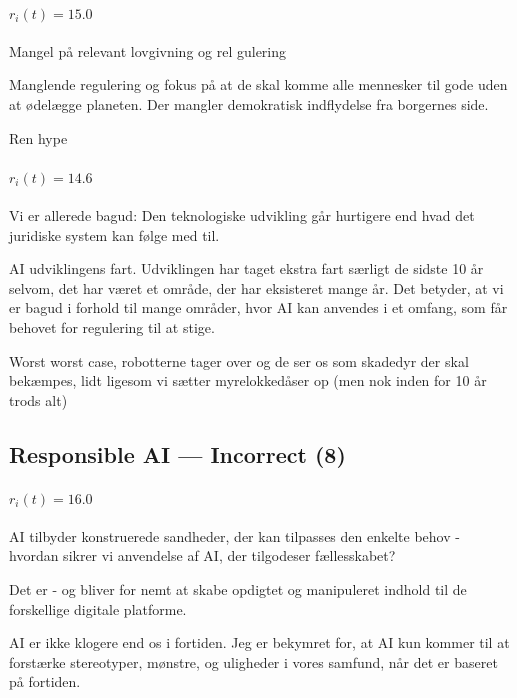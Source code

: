 \paragraph{$r_i(t) = 15.0$}
\begin{description}[style=nextline,leftmargin=1em,font=\normalfont\bfseries]
  \item[Anchor] Mangel på relevant lovgivning og rel  gulering
  \item[Human-judged closer] Manglende regulering og fokus på at de skal komme alle mennesker til gode uden at ødelægge planeten. Der mangler demokratisk indflydelse fra borgernes side.
  \item[Human-judged farther] Ren hype
\end{description}
\paragraph{$r_i(t) = 14.6$}
\begin{description}[style=nextline,leftmargin=1em,font=\normalfont\bfseries]
  \item[Anchor] Vi er allerede bagud:  Den teknologiske udvikling går hurtigere end hvad det juridiske system kan følge med til.
  \item[Human-judged closer] AI udviklingens fart.  Udviklingen har taget ekstra fart særligt de sidste 10 år selvom, det har været et område, der har eksisteret mange år. Det betyder, at vi er bagud i forhold til mange områder, hvor AI kan anvendes i et omfang, som får behovet for regulering til at stige.
  \item[Human-judged farther] Worst worst case, robotterne tager over og de ser os som skadedyr der skal bekæmpes, lidt ligesom vi sætter myrelokkedåser op (men nok inden for 10 år trods alt)
\end{description}

\subsection{Responsible AI --- Incorrect (8)}
\label{app:triplets-rai-incorrect}

\paragraph{$r_i(t) = 16.0$}
\begin{description}[style=nextline,leftmargin=1em,font=\normalfont\bfseries]
  \item[Anchor] AI tilbyder konstruerede sandheder, der kan tilpasses den enkelte behov - hvordan sikrer vi anvendelse af AI, der tilgodeser fællesskabet?
  \item[Human-judged closer] Det er - og bliver for nemt at skabe opdigtet og manipuleret indhold til de forskellige digitale platforme.
  \item[Human-judged farther] AI er ikke klogere end os i fortiden.  Jeg er bekymret for, at AI kun kommer til at forstærke stereotyper, mønstre, og uligheder i vores samfund, når det er baseret på fortiden.
\end{description}
